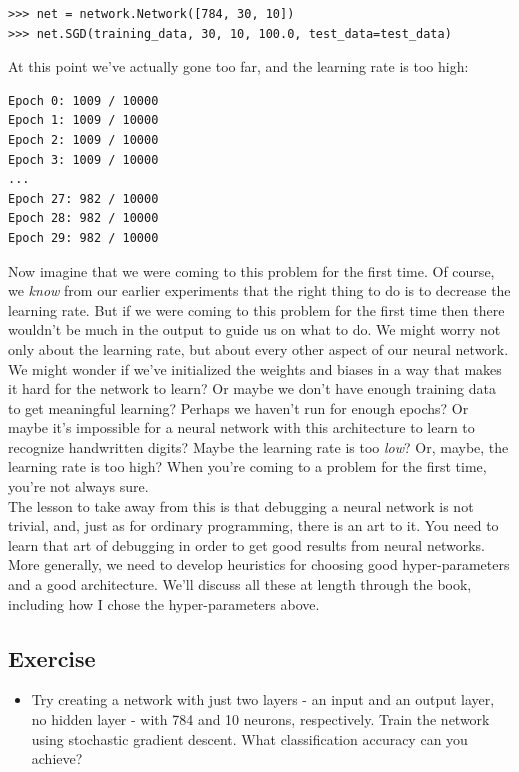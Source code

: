\begin{lstlisting}
>>> net = network.Network([784, 30, 10])
>>> net.SGD(training_data, 30, 10, 100.0, test_data=test_data)
\end{lstlisting}

At this point we've actually gone too far, and the learning rate is too high:

\begin{lstlisting}
Epoch 0: 1009 / 10000
Epoch 1: 1009 / 10000
Epoch 2: 1009 / 10000
Epoch 3: 1009 / 10000
...
Epoch 27: 982 / 10000
Epoch 28: 982 / 10000
Epoch 29: 982 / 10000
\end{lstlisting}

Now imagine that we were coming to this problem for the first time. Of course, we \textit{know} from our earlier experiments that the right thing to do is to decrease the learning rate. But if we were coming to this problem for the first time then there wouldn't be much in the output to guide us on what to do. We might worry not only about the learning rate, but about every other aspect of our neural network. We might wonder if we've initialized the weights and biases in a way that makes it hard for the network to learn? Or maybe we don't have enough training data to get meaningful learning? Perhaps we haven't run for enough epochs? Or maybe it's impossible for a neural network with this architecture to learn to recognize handwritten digits? Maybe the learning rate is too \textit{low}? Or, maybe, the learning rate is too high? When you're coming to a problem for the first time, you're not always sure.\\

The lesson to take away from this is that debugging a neural network is not trivial, and, just as for ordinary programming, there is an art to it. You need to learn that art of debugging in order to get good results from neural networks. More generally, we need to develop heuristics for choosing good hyper-parameters and a good architecture. We'll discuss all these at length through the book, including how I chose the hyper-parameters above.

\subsection*{Exercise}
\label{subs: exercise create NN with 2 layers}

\begin{itemize}
\item Try creating a network with just two layers - an input and an output layer, no hidden layer - with 784 and 10 neurons, respectively. Train the network using stochastic gradient descent. What classification accuracy can you achieve?
\end{itemize}

